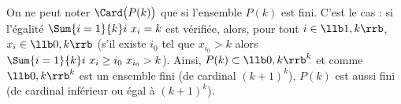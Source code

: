 \begin{remark}%
  On ne peut noter $\Card\big( P(k) \big)$ que si l'ensemble $P(k)$
  est fini. C'est le cas : si l'égalité $\Sum{i=1}{k} i \ x_i = k$ est
  vérifiée, alors, pour tout $i \in \llb 1, k \rrb$, $x_i \in \llb 0,
  k \rrb$ (s'il existe $i_0$ tel que $x_{i_0} > k$ alors $\Sum{i=1}{k}
  i \ x_i \geq i_0 \ x_{i_0} > k$). Ainsi, $P(k) \subset \llb 0, k
  \rrb^k$ et comme $\llb 0, k \rrb^k$ est un ensemble fini (de
  cardinal $(k + 1)^k$), $P(k)$ est aussi fini (de cardinal inférieur
  ou égal à $(k + 1)^k$).
\end{remark}



\newpage


